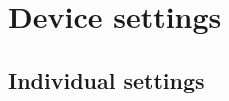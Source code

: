 \section{Device settings}















\subsection{Individual settings}
\label{sec:individualSettings}


